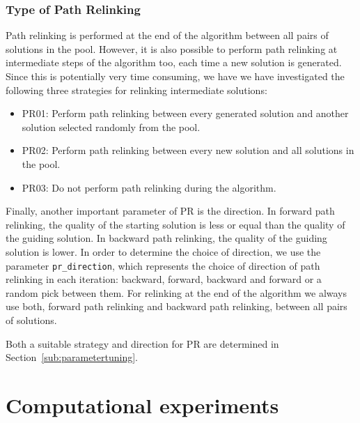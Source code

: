 \documentclass[a4paper,11pt,authoryear]{elsarticle}
\begin{document}
\subsubsection{Type of Path Relinking}
\label{subsub:typepathrelinking}
\noindent Path relinking is performed at the end of the algorithm between all pairs of solutions in the pool. However, it is also possible to perform path relinking at intermediate steps of the algorithm too, each time a new solution is generated. Since this is potentially very time consuming, we have we have investigated the following three strategies for relinking intermediate solutions:
\begin{itemize}
    \item PR01: Perform path relinking between every generated solution and another solution selected randomly from the pool.
    \item PR02: Perform path relinking between every new solution and all solutions in the pool.
    \item PR03: Do not perform path relinking during the algorithm.
\end{itemize}

\noindent Finally, another important parameter of PR is the direction. In forward path relinking, the quality of the starting solution is less or equal than the quality of the guiding solution. In backward path relinking, the quality of the guiding solution is lower. In order to determine the choice of direction, we use the parameter \texttt{pr\_direction}, which represents the choice of direction of path relinking in each iteration: backward, forward, backward and forward or a random pick between them. For relinking at the end of the algorithm we always use both, forward path relinking and backward path relinking, between all pairs of solutions.

Both a suitable strategy and direction for PR are determined in Section~\ref{sub:parametertuning}.

\section{Computational experiments}
\label{sec:computationalexperiments}

\end{document}
